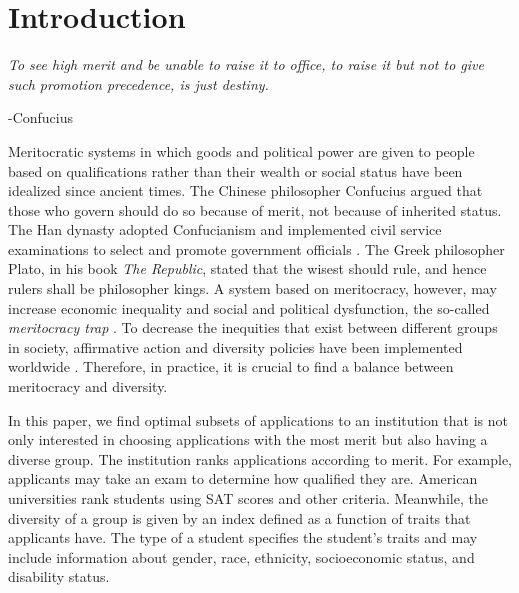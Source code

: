 \documentclass[12pt]{amsart}
\theoremstyle{remark}
\begin{document}

\maketitle




\section{Introduction}
\epigraph{\textit{To see high merit and be unable to raise it to office, to raise it but not to give such promotion precedence, is just destiny.}}{-Confucius}

Meritocratic systems in which goods and political power are given to
people based on qualifications rather than their wealth or social status
have been idealized since ancient times. The Chinese philosopher
Confucius argued that those who govern should do so because of merit, not because of inherited status. The Han dynasty adopted Confucianism and
implemented civil service examinations to select and promote government
officials \citep{dien2001}.
The Greek philosopher Plato, in his book
\emph{The Republic}, stated that the wisest should rule, and hence rulers
shall be philosopher kings. A system based on meritocracy, however, may
increase economic inequality and social and political dysfunction,
the so-called \emph{meritocracy trap} \citep{markovits2019}. To decrease the
inequities that exist between different groups in society, affirmative action
and diversity policies have been implemented worldwide \citep{sowell04}.
Therefore, in practice, it is crucial to find a balance between meritocracy
and diversity.

In this paper, we find optimal subsets of applications to an institution that
is not only interested in choosing applications with the most merit but also having a diverse group. The institution ranks applications according to merit.
For example, applicants may take an exam to determine how qualified they are. American universities rank students using SAT scores and other criteria. Meanwhile, the diversity of
a group is given by an index defined as a function of traits that applicants have.
The type of a student specifies the student's traits and may include information about
gender, race, ethnicity, socioeconomic status, and disability status.
\end{document}
